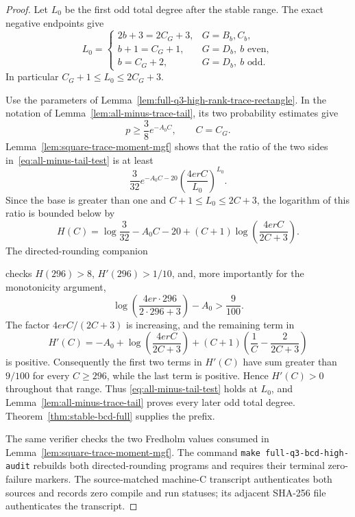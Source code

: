 \documentclass[11pt,reqno]{amsart}
\theoremstyle{plain}
\theoremstyle{definition}
\begin{document}
\begin{proof}
Let $L_0$ be the first odd total degree after the stable range.  The exact
negative endpoints give
\[
 L_0=
 \begin{cases}
  2b+3=2C_G+3,&G=B_b,C_b,\\
  b+1=C_G+1,&G=D_b,\ b\text{ even},\\
  b=C_G+2,&G=D_b,\ b\text{ odd}.
 \end{cases}
\]
In particular $C_G+1\leq L_0\leq2C_G+3$.

Use the parameters of
Lemma~\ref{lem:full-q3-high-rank-trace-rectangle}.  In the notation of
Lemma~\ref{lem:all-minus-trace-tail}, its two probability estimates give
\[
 p\geq\frac38e^{-A_0C},\qquad C=C_G.
\]
Lemma~\ref{lem:square-trace-moment-mgf} shows that the ratio of the two
sides in~\eqref{eq:all-minus-tail-test} is at least
\[
 \frac3{32}e^{-A_0C-20}
 \left(\frac{4erC}{L_0}\right)^{L_0}.
\]
Since the base is greater than one and
$C+1\leq L_0\leq2C+3$, the logarithm of this ratio is bounded below by
\begin{equation}
\label{eq:bcd-high-rank-margin}
 H(C)=\log\frac3{32}-A_0C-20
 +(C+1)\log\left(\frac{4erC}{2C+3}\right).
\end{equation}
The directed-rounding companion
\begin{center}
\end{center}
checks $H(296)>8$, $H'(296)>1/10$, and, more importantly for the
monotonicity argument,
\[
 \log\left(\frac{4er\cdot296}{2\cdot296+3}\right)-A_0
 >\frac9{100}.
\]
The factor $4erC/(2C+3)$ is increasing, and the remaining term in
\[
 H'(C)=-A_0+\log\left(\frac{4erC}{2C+3}\right)
 +(C+1)\left(\frac1C-\frac2{2C+3}\right)
\]
is positive.  Consequently the first two terms in $H'(C)$ have sum
greater than $9/100$ for every $C\geq296$, while the last term is positive.
Hence $H'(C)>0$ throughout that range.  Thus
\eqref{eq:all-minus-tail-test} holds at $L_0$, and
Lemma~\ref{lem:all-minus-trace-tail} proves every later odd total degree.
Theorem~\ref{thm:stable-bcd-full} supplies the prefix.

The same verifier checks the two Fredholm values consumed in
Lemma~\ref{lem:square-trace-moment-mgf}.  The command
\texttt{make full-q3-bcd-high-audit} rebuilds both directed-rounding
programs and requires their terminal zero-failure markers.  The
source-matched machine-C transcript
authenticates both sources and records zero compile and run statuses; its
adjacent SHA-256 file authenticates the transcript.
\end{proof}
\end{document}
